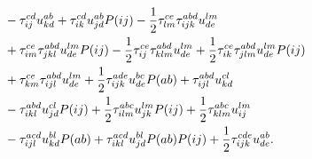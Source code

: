 \begin{align}
            \nonumber \\
            &\qquad
            - \tau^{cd}_{ij} u^{ab}_{kd}
            + \tau^{cd}_{ik} u^{ab}_{jd} P(ij)
            - \frac{1}{2} \tau^{ce}_{lm} \tau^{abd}_{ijk} u^{lm}_{de}
            \nonumber \\
            &\qquad
            + \tau^{ce}_{im} \tau^{abd}_{jkl} u^{lm}_{de} P(ij)
            - \frac{1}{2} \tau^{ce}_{ij} \tau^{abd}_{klm} u^{lm}_{de}
            + \frac{1}{2} \tau^{ce}_{ik} \tau^{abd}_{jlm} u^{lm}_{de} P(ij)
            \nonumber \\
            &\qquad
            + \tau^{ce}_{km} \tau^{abd}_{ijl} u^{lm}_{de}
            + \frac{1}{2} \tau^{ade}_{ijk} u^{bc}_{de} P(ab)
            + \tau^{abd}_{ijl} u^{cl}_{kd}
            \nonumber \\
            &\qquad
            - \tau^{abd}_{ikl} u^{cl}_{jd} P(ij)
            + \frac{1}{2} \tau^{abc}_{ilm} u^{lm}_{jk} P(ij)
            + \frac{1}{2} \tau^{abc}_{klm} u^{lm}_{ij}
            \nonumber \\
            &\qquad
            - \tau^{acd}_{ijl} u^{bl}_{kd} P(ab)
            + \tau^{acd}_{ikl} u^{bl}_{jd} P(ab) P(ij)
            + \frac{1}{2} \tau^{cde}_{ijk} u^{ab}_{de}.
        \end{align}
